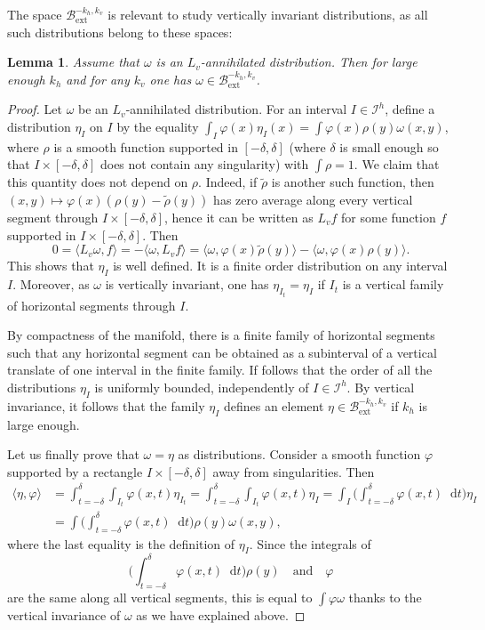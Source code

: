 \documentclass[JEP,XML,SOM,Unicode]{cedram}
\newcommand{\ext}{\mathrm{ext}}
\newcommand{\boI}{\mathcal{I}}
\newcommand{\boB}{\mathcal{B}}
\newcommand{\dd}{\mathop{}\!\mathrm{d}}
\newcommand{\paregg}[1]{\biggl(#1\biggr)}
\let\phi\varphi
\newtheorem{lem}[thm]{Lemma}
\theoremstyle{definition}
\numberwithin{equation}{section}
\begin{document}
The space $\boB^{-k_h, k_v}_{\ext}$ is relevant to study vertically invariant
distributions, as all such distributions belong to these spaces:
\begin{lem}
\label{lem:all_Lvinv_in_boBext} Assume that $\omega$ is an $L_v$-annihilated
distribution. Then for large enough $k_h$ and for any $k_v$ one has $\omega
\in \boB^{-k_h, k_v}_{\ext}$.
\end{lem}
\begin{proof}
Let $\omega$ be an $L_v$-annihilated distribution. For an interval $I \in
\boI^h$, define a distribution $\eta_I$ on $I$ by the equality $\int_I
\phi(x) \eta_I(x) = \int \phi(x) \rho(y) \omega(x,y)$, where $\rho$ is a
smooth function supported in $[-\delta,\delta]$ (where $\delta$ is small
enough so that $I \times [-\delta, \delta]$ does not contain any singularity)
with $\int \rho = 1$. We claim that this quantity does not depend on $\rho$.
Indeed, if $\tilde \rho$ is another such function, then $(x,y)\mapsto \phi(x)
(\rho(y)-\tilde \rho(y))$ has zero average along every vertical segment
through $I \times [-\delta, \delta]$, hence it can be written as $L_v f$ for
some function $f$ supported in $I \times [-\delta,\delta]$. Then
\begin{equation*}
0 = \langle L_v \omega, f \rangle = - \langle \omega, L_v f \rangle
= \langle \omega, \phi(x)\tilde \rho(y) \rangle - \langle \omega, \phi(x) \rho(y) \rangle.
\end{equation*}
This shows that $\eta_I$ is well defined. It is a finite order distribution
on any interval $I$. Moreover, as $\omega$ is vertically invariant, one has
$\eta_{I_t} = \eta_I$ if $I_t$ is a vertical family of horizontal segments
through $I$.

By compactness of the manifold, there is a finite family of horizontal
segments such that any horizontal segment can be obtained as a subinterval of
a vertical translate of one interval in the finite family. If follows that
the order of all the distributions $\eta_I$ is uniformly bounded,
independently of $I \in \boI^h$. By vertical invariance, it follows that the
family $\eta_I$ defines an element $\eta \in \boB^{-k_h, k_v}_{\ext}$ if $k_h$
is large enough.

Let us finally prove that $\omega = \eta$ as distributions. Consider a smooth
function $\phi$ supported by a rectangle $I \times [-\delta, \delta]$ away
from singularities. Then
\begin{align*}
\langle \eta, \phi \rangle
&= \int_{t={-\delta}}^\delta \int_{I_t} \phi(x,t) \eta_{I_t}
= \int_{t={-\delta}}^\delta \int_{I_t} \phi(x,t) \eta_I
=\int_I \paregg{\int_{t={-\delta}}^\delta \phi(x,t) \dd t} \eta_I
\\&=\int \paregg{\int_{t={-\delta}}^\delta \phi(x,t) \dd t} \rho(y) \omega(x,y),
\end{align*}
where the last equality is the definition of $\eta_I$. Since the integrals of
\[
\paregg{\int_{t={-\delta}}^\delta \phi(x,t) \dd t} \rho(y)\quad\text{and}\quad \phi
\]
are
the same along all vertical segments, this is equal to $\int \phi \omega$
thanks to the vertical invariance of $\omega$ as we have explained above.


\end{proof}
\end{document}
